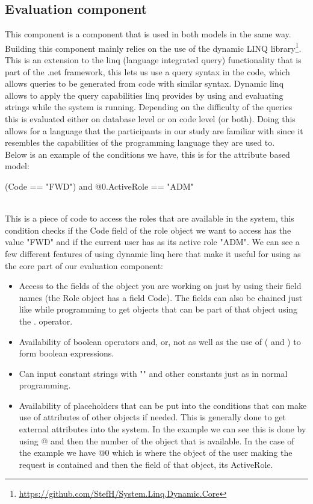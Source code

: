\subsection{Evaluation component}
This component is a component that is used in both models in the same way.
Building this component mainly relies on the use of the dynamic LINQ library\footnote{\url{https://github.com/StefH/System.Linq.Dynamic.Core}}.
This is an extension to the linq (language integrated query) functionality that is part of the .net framework, this lets us use a query syntax in the code, which allows queries to be generated from code with similar syntax.
Dynamic linq allows to apply the query capabilities linq provides by using and evaluating strings while the system is running.
Depending on the difficulty of the queries this is evaluated either on database level or on code level (or both).
Doing this allows for a language that the participants in our study are familiar with since it resembles the capabilities of the programming language they are used to.
\\
Below is an example of the conditions we have, this is for the attribute based model:
\begin{algorithm}
    (Code == "FWD") and @0.ActiveRole == "ADM"
\end{algorithm}
\\
This is a piece of code to access the roles that are available in the system, this condition checks if the Code field of the role object we want to access has the value "FWD" and if the current user has as its active role "ADM".
We can see a few different features of using dynamic linq here that make it useful for using as the core part of our evaluation component:
\begin{itemize}
    \item Access to the fields of the object you are working on just by using their field names (the Role object has a field Code). The fields can also be chained just like while programming to get objects that can be part of that object using the . operator.
    \item Availability of boolean operators and, or, not as well as the use of ( and ) to form boolean expressions.
    \item Can input constant strings with "" and other constants just as in normal programming.
    \item Availability of placeholders that can be put into the conditions that can make use of attributes of other objects if needed. This is generally done to get external attributes into the system. In the example we can see this is done by using @ and then the number of the object that is available. In the case of the example we have @0 which is where the object of the user making the request is contained and then the field of that object, its ActiveRole.
\end{itemize}
